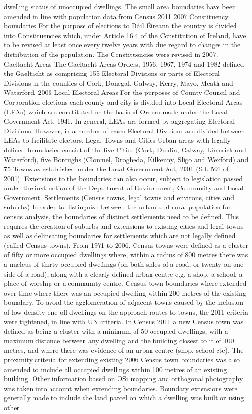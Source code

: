 dwelling status of unoccupied dwellings.  The small area boundaries have been amended in line with population data from Census 2011  2007 Constituency boundaries  For the purpose of elections to Dáil Éireann the country is divided into Constituencies which, under Article 16.4 of the  Constitution of Ireland, have to be revised at least once every twelve years with due regard to changes in the distribution  of the population. The Constituencies were revised in 2007.  Gaeltacht Areas  The Gaeltacht Areas Orders, 1956, 1967, 1974 and 1982 defined the Gaeltacht as comprising 155 Electoral Divisions or  parts of Electoral Divisions in the counties of Cork, Donegal, Galway, Kerry, Mayo, Meath and Waterford.  2008 Local Electoral Areas  For the purposes of County Council and Corporation elections each county and city is divided into Local Electoral  Areas (LEAs) which are constituted on the basis of Orders made under the Local Government Act, 1941. In general,  LEAs are formed by aggregating Electoral Divisions. However, in a number of cases Electoral Divisions are divided  between LEAs to facilitate electors.  Legal Towns and Cities  Urban areas with legally defined boundaries consist of the five Cities (Cork, Dublin, Galway, Limerick and Waterford),  five Boroughs (Clonmel, Drogheda, Kilkenny, Sligo and Wexford) and 75 Towns as established under the Local  Government Act, 2001 (S.I. 591 of 2001). Extensions to the boundaries can also occur, subject to legislation passed  under the instruction of the Department of Environment, Community and Local Government.  Settlements (Census towns, legal towns and environs, cities and suburbs)  In order to distinguish between the urban and rural population for census analysis, the boundaries of distinct settlements  need to be defined. This requires the creation of suburbs and extensions to existing cities and legal towns as well as  delineating boundaries for settlements which are not legally defined (called Census towns).  From 1971 to 2006, Census towns were defined as a cluster of fifty or more occupied dwellings where, within a radius  of 800 metres there was a nucleus of thirty occupied dwellings (on both sides of a road, or twenty on one side of a  road), along with a clearly defined urban centre e.g. a shop, a school, a place of worship or a community centre. Census  town boundaries where extended over time where there was an occupied dwelling within 200 metres of the existing  boundary.  To avoid the agglomeration of adjacent towns caused by the inclusion of low density one off dwellings on the approach  routes to towns, the 2011 criteria were tightened, in line with UN criteria.  In Census 2011 a new Census town was defined as being a cluster with a minimum of 50 occupied dwellings, with a  maximum distance between any dwelling and the building closest to it of 100 metres, and where there was evidence of  an urban centre (shop, school etc). The proximity criteria for extending existing 2006 Census town boundaries was also  amended to include all occupied dwellings within 100 metres of an existing building. Other information based on OSi  mapping and orthogonal photography was taken into account when extending boundaries. Boundary extensions were  generally made to include the land parcel on which a dwelling was built or using other 
